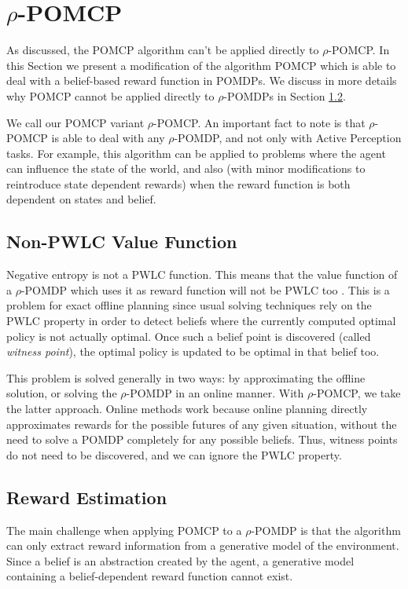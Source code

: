 \section{$\rho$-POMCP}

As discussed, the POMCP algorithm can't be applied directly to $\rho$-POMCP. In this Section we
present a modification of the algorithm POMCP which is able to deal with a belief-based reward
function in POMDPs. We discuss in more details why POMCP cannot be applied directly to $\rho$-POMDPs
in Section \ref{ref:rewestimation}.

We call our POMCP variant $\rho$-POMCP. An important fact to note is that $\rho$-POMCP is able to deal
with any $\rho$-POMDP, and not only with Active Perception tasks. For example, this algorithm can be
applied to problems where the agent can influence the state of the world, and also (with minor
modifications to reintroduce state dependent rewards) when the reward function is both dependent on
states and belief.

\subsection{Non-PWLC Value Function}

Negative entropy is not a PWLC function. This means that the value function of a $\rho$-POMDP which
uses it as reward function will not be PWLC too \cite{cit:rpomdp}. This is a problem for exact
offline planning since usual solving techniques rely on the PWLC property in order to detect beliefs
where the currently computed optimal policy is not actually optimal. Once such a belief point is
discovered (called \textit{witness point}), the optimal policy is updated to be optimal in that
belief too.

This problem is solved generally in two ways: by approximating the offline solution, or solving the
$\rho$-POMDP in an online manner. With $\rho$-POMCP, we take the latter approach. Online methods
work because online planning directly approximates rewards for the possible futures of any given
situation, without the need to solve a POMDP completely for any possible beliefs. Thus, witness
points do not need to be discovered, and we can ignore the PWLC property.

\subsection{Reward Estimation}\label{ref:rewestimation}

The main challenge when applying POMCP to a $\rho$-POMDP is that the algorithm can only extract
reward information from a generative model of the environment. Since a belief is an abstraction
created by the agent, a generative model containing a belief-dependent reward function cannot exist.

